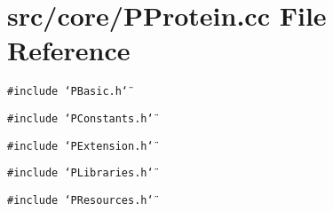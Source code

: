 \section{src/core/PProtein.cc File Reference}
\label{PProtein_8cc}


{\tt \#include \char`\"{}PBasic.h\char`\"{}}\par
{\tt \#include \char`\"{}PConstants.h\char`\"{}}\par
{\tt \#include \char`\"{}PExtension.h\char`\"{}}\par
{\tt \#include \char`\"{}PLibraries.h\char`\"{}}\par
{\tt \#include \char`\"{}PResources.h\char`\"{}}\par
